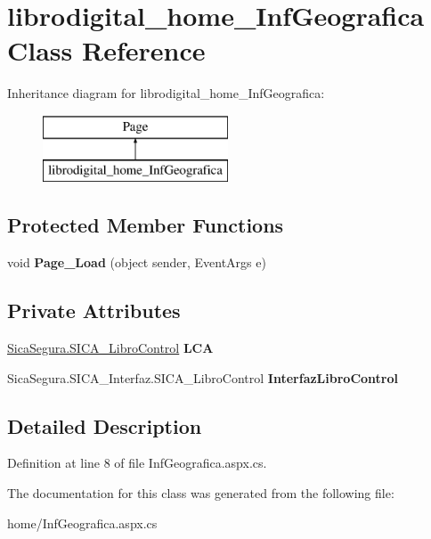 \hypertarget{classlibrodigital__home___inf_geografica}{}\section{librodigital\+\_\+home\+\_\+\+Inf\+Geografica Class Reference}
\label{classlibrodigital__home___inf_geografica}
Inheritance diagram for librodigital\+\_\+home\+\_\+\+Inf\+Geografica\+:\begin{figure}[H]
\begin{center}
\leavevmode
\includegraphics[height=2.000000cm]{classlibrodigital__home___inf_geografica}
\end{center}
\end{figure}
\subsection*{Protected Member Functions}
\begin{DoxyCompactItemize}
\item 
void {\bfseries Page\+\_\+\+Load} (object sender, Event\+Args e)\hypertarget{classlibrodigital__home___inf_geografica_aef99c6b4b55e673a5003cae2779cd621}{}\label{classlibrodigital__home___inf_geografica_aef99c6b4b55e673a5003cae2779cd621}

\end{DoxyCompactItemize}
\subsection*{Private Attributes}
\begin{DoxyCompactItemize}
\item 
\hyperlink{class_sica_segura_1_1_s_i_c_a___libro_control}{Sica\+Segura.\+S\+I\+C\+A\+\_\+\+Libro\+Control} {\bfseries L\+CA}\hypertarget{classlibrodigital__home___inf_geografica_a8bed2bac38863be170cfead53631e8df}{}\label{classlibrodigital__home___inf_geografica_a8bed2bac38863be170cfead53631e8df}

\item 
Sica\+Segura.\+S\+I\+C\+A\+\_\+\+Interfaz.\+S\+I\+C\+A\+\_\+\+Libro\+Control {\bfseries Interfaz\+Libro\+Control}\hypertarget{classlibrodigital__home___inf_geografica_ab3d99e7eb45c03caeb1b7c5fc31beca8}{}\label{classlibrodigital__home___inf_geografica_ab3d99e7eb45c03caeb1b7c5fc31beca8}

\end{DoxyCompactItemize}


\subsection{Detailed Description}


Definition at line 8 of file Inf\+Geografica.\+aspx.\+cs.



The documentation for this class was generated from the following file\+:\begin{DoxyCompactItemize}
\item 
home/Inf\+Geografica.\+aspx.\+cs\end{DoxyCompactItemize}
